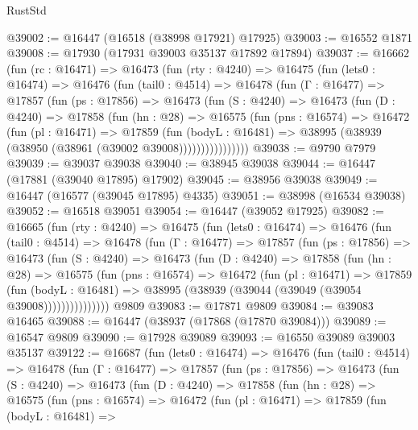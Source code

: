 \begin{lexlean}{RustStd}
\begin{coremodule}
@39002 := @16447 (@16518 (@38998 @17921) @17925)
@39003 := @16552 @1871
@39008 := @17930 (@17931 @39003 @35137 @17892 @17894)
@39037 := @16662
    (fun (rc : @16471) =>
    @16473
      (fun (rty : @4240) =>
      @16475
        (fun (lets0 : @16474) =>
        @16476
          (fun (tail0 : @4514) =>
          @16478
            (fun (Γ : @16477) =>
            @17857
              (fun (ps : @17856) =>
              @16473
                (fun (S : @4240) =>
                @16473
                  (fun (D : @4240) =>
                  @17858
                    (fun (hn : @28) =>
                    @16575
                      (fun (pns : @16574) =>
                      @16472
                        (fun (pl : @16471) =>
                        @17859
                          (fun (bodyL : @16481) =>
                          @38995 (@38939 (@38950 (@38961 (@39002 @39008))))))))))))))))
@39038 := @9790 @7979
@39039 := @39037 @39038
@39040 := @38945 @39038
@39044 := @16447 (@17881 (@39040 @17895) @17902)
@39045 := @38956 @39038
@39049 := @16447 (@16577 (@39045 @17895) @4335)
@39051 := @38998 (@16534 @39038)
@39052 := @16518 @39051
@39054 := @16447 (@39052 @17925)
@39082 := @16665
    (fun (rty : @4240) =>
    @16475
      (fun (lets0 : @16474) =>
      @16476
        (fun (tail0 : @4514) =>
        @16478
          (fun (Γ : @16477) =>
          @17857
            (fun (ps : @17856) =>
            @16473
              (fun (S : @4240) =>
              @16473
                (fun (D : @4240) =>
                @17858
                  (fun (hn : @28) =>
                  @16575
                    (fun (pns : @16574) =>
                    @16472
                      (fun (pl : @16471) =>
                      @17859
                        (fun (bodyL : @16481) =>
                        @38995 (@38939 (@39044 (@39049 (@39054 @39008)))))))))))))))
    @9809
@39083 := @17871 @9809
@39084 := @39083 @16465
@39088 := @16447 (@38937 (@17868 (@17870 @39084)))
@39089 := @16547 @9809
@39090 := @17928 @39089
@39093 := @16550 @39089 @39003 @35137
@39122 := @16687
    (fun (lets0 : @16474) =>
    @16476
      (fun (tail0 : @4514) =>
      @16478
        (fun (Γ : @16477) =>
        @17857
          (fun (ps : @17856) =>
          @16473
            (fun (S : @4240) =>
            @16473
              (fun (D : @4240) =>
              @17858
                (fun (hn : @28) =>
                @16575
                  (fun (pns : @16574) =>
                  @16472
                    (fun (pl : @16471) =>
                    @17859
                      (fun (bodyL : @16481) =>

\end{coremodule}
\end{lexlean}
